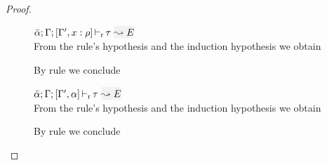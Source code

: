 \begin{proof}
\begin{description}
\item[]\quad
$\dlres{\bar\alpha}{\tenv}{\tenv',\relation{x}{\rulet}}{\type}{E}$ \ \\

From the rule's hypothesis and the induction hypothesis we obtain
\begin{myequation*}
\end{myequation*}
By rule  we conclude
\begin{myequation*}
\end{myequation*}

\item[]\quad
$\dlres{\bar\alpha}{\tenv}{\tenv',\alpha}{\type}{E}$\ \\

From the rule's hypothesis and the induction hypothesis we obtain
\begin{myequation*}
\end{myequation*}
By rule  we conclude
\begin{myequation*}
\end{myequation*}
\end{description}
\end{proof}

